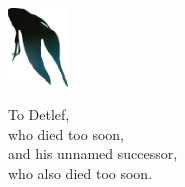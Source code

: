 

\begin{center}
\includegraphics[width=0.12\textwidth]{frontmatter/detlef.pdf}

\vspace{4em}

\noindent To Detlef,\\
who died too soon,\\
and his unnamed successor,\\
who also died too soon.

\end{center}
